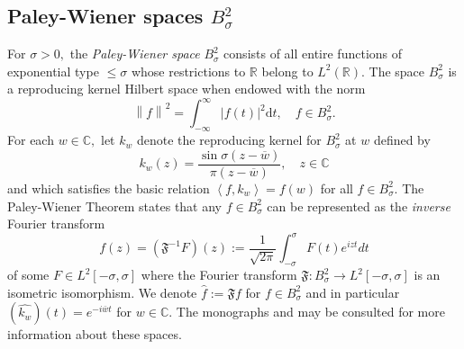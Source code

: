 \documentclass[11pt]{amsart}%
\numberwithin{equation}{section}
\theoremstyle{plain}
\theoremstyle{definition}
\theoremstyle{definition}
\begin{document}
\subsection{Paley-Wiener spaces \texorpdfstring{$B^2_{\sigma}$}{lg}}  For $\sigma>0,$ the \emph{Paley-Wiener space} $B_\sigma^2$ consists of all entire functions of exponential type $\leq\sigma$ whose restrictions to $\mathbb{R}$ belong to $L^2(\mathbb{R}).$	The space $B_\sigma^2$ is a  reproducing kernel Hilbert space when endowed with the norm
\begin{equation*}
\left\| f\right\|^2 = \int^{\infty}_{-\infty}|f(t)|^2\mathrm{d}t, \quad f\in B^2_{\sigma}.
\end{equation*}
For each $w\in \mathbb{C},$ let $k_w$ denote the reproducing kernel for $B_{\sigma}^2$ at $w$ defined by
\begin{equation*}
k_w(z)=\frac{\sin \sigma(z-\overline{w})}{\pi(z-\overline{w})}, \quad z\in \mathbb{C}
\end{equation*}
and which satisfies the basic relation $\left\langle f,k_w\right\rangle =f(w)$ for all $f\in B_{\sigma}^2.$ The Paley-Wiener Theorem states that any $f\in B^2_\sigma$ can be represented as the \emph{inverse} Fourier transform 
\[
f(z)=(\mathfrak{F}^{-1}F)(z):=\frac{1}{\sqrt{2\pi}}\int_{-\sigma}^\sigma F(t)e^{izt}dt
\]
of some $F\in L^2[-\sigma,\sigma]$ where the Fourier transform $\mathfrak{F}:B^2_\sigma\to L^2[-\sigma,\sigma]$ is an isometric isomorphism. We denote $\widehat{f}:=\mathfrak{F}f$ for $f\in B^2_\sigma$ and in particular $(\widehat{k_w})(t)=e^{-i\bar{w}t}$ for $w\in\mathbb{C}$.
The monographs \cite{Branges} and \cite{young} may be consulted for more information about these spaces.
\end{document}
